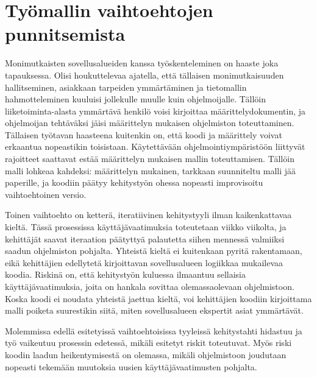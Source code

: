 \hypertarget{tyuxf6mallin-vaihtoehtojen-punnitsemista}{%
\section{Työmallin vaihtoehtojen
punnitsemista}\label{tyuxf6mallin-vaihtoehtojen-punnitsemista}}

Monimutkaisten sovellusalueiden kanssa työskenteleminen on haaste joka
tapauksessa. Olisi houkuttelevaa ajatella, että tällaisen
monimutkaisuuden hallitseminen, asiakkaan tarpeiden ymmärtäminen ja
tietomallin hahmotteleminen kuuluisi jollekulle muulle kuin
ohjelmoijalle. Tällöin liiketoiminta-alasta ymmärtävä henkilö voisi
kirjoittaa määrittelydokumentin, ja ohjelmoijan tehtäväksi jäisi
määrittelyn mukaisen ohjelmiston toteuttaminen. Tällaisen työtavan
haasteena kuitenkin on, että koodi ja määrittely voivat erkaantua
nopeastikin toisistaan. Käytettävään ohjelmointiympäristöön liittyvät
rajoitteet saattavat estää määrittelyn mukaisen mallin toteuttamisen.
Tällöin malli lohkeaa kahdeksi: määrittelyn mukainen, tarkkaan
suunniteltu malli jää paperille, ja koodiin päätyy kehitystyön ohessa
nopeasti improvisoitu vaihtoehtoinen versio.\cite{evans:ddd}

Toinen vaihtoehto on ketterä, iteratiivinen kehitystyyli ilman
kaikenkattavaa kieltä. Tässä prosessissa käyttäjävaatimuksia toteutetaan
viikko viikolta, ja kehittäjät saavat iteraation päätyttyä palautetta
siihen mennessä valmiiksi saadun ohjelmiston pohjalta. Yhteistä kieltä
ei kuitenkaan pyritä rakentamaan, eikä kehittäjien edellytetä
kirjoittavan sovellusalueen logiikkaa mukailevaa koodia. Riskinä on,
että kehitystyön kuluessa ilmaantuu sellaisia käyttäjävaatimuksia, joita
on hankala sovittaa olemassaolevaan ohjelmistoon. Koska koodi ei noudata
yhteistä jaettua kieltä, voi kehittäjien koodiin kirjoittama malli
poiketa suurestikin siitä, miten sovellusalueen ekspertit asiat
ymmärtävät.\cite{evans:ddd}

Molemmissa edellä esitetyissä vaihtoehtoisissa tyyleissä kehitystahti
hidastuu ja työ vaikeutuu prosessin edetessä, mikäli esitetyt riskit
toteutuvat. Myös riski koodin laadun heikentymisestä on olemassa, mikäli
ohjelmistoon joudutaan nopeasti tekemään muutoksia uusien
käyttäjävaatimusten pohjalta.
